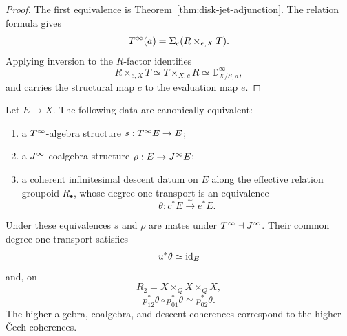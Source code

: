 \begin{proof}
The first equivalence is Theorem~\ref{thm:disk-jet-adjunction}.  The relation formula gives
\[
    T^{\infty}(a)=\Sigma_c(R\times_{e,X}T).
\]
Applying inversion to the $R$-factor identifies
\[
    R\times_{e,X}T
    \simeq
    T\times_{X,c}R
    \simeq
    \mathbb D^\infty_{X/S,a},
\]
and carries the structural map $c$ to the evaluation map $e$.
\end{proof}

\begin{theorem}
\label{thm:relation-transport}
Let $E\to X$.  The following data are canonically equivalent:
\begin{enumerate}
\item a $T^{\infty}$-algebra structure $s:T^{\infty} E\to E$;
\item a $J^{\infty}$-coalgebra structure $\rho:E\to J^{\infty} E$;
\item a coherent infinitesimal descent datum on $E$ along the effective relation groupoid $R_\bullet$, whose degree-one transport is an equivalence
\[
    \theta:c^*E\xrightarrow{\sim}e^*E.
\]
\end{enumerate}
Under these equivalences $s$ and $\rho$ are mates under $T^{\infty}\dashv J^{\infty}$.  Their common degree-one transport satisfies
\[
    u^*\theta\simeq\operatorname{id}_E
\]
and, on
\[
    R_2=X\times_QX\times_QX,
\]
\[
    \boxed{
    p_{12}^*\theta\circ p_{01}^*\theta
    \simeq
    p_{02}^*\theta.
    }
\]
The higher algebra, coalgebra, and descent coherences correspond to the higher \v{C}ech coherences.
\end{theorem}

